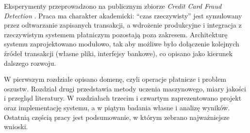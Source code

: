 Eksperymenty przeprowadzono na publicznym zbiorze \emph{Credit Card Fraud Detection} \cite{kaggle_ulb}. Praca ma charakter akademicki: \enquote{czas rzeczywisty} jest symulowany przez odtwarzanie zapisanych transakcji, a wdrożenie produkcyjne i integracja z rzeczywistym systemem płatniczym pozostają poza zakresem. Architekturę systemu zaprojektowano modułowo, tak aby możliwe było dołączenie kolejnych źródeł transakcji (własne pliki, interfejsy bankowe), co opisano jako kierunek dalszego rozwoju. 

W pierwszym rozdziale opisano domenę, czyli operacje płatnicze i problem oszustw. Rozdział drugi przedstawia metody uczenia maszynowego, miary jakości i przegląd literatury. W rozdziałach trzecim i czwartym zaprezentowano projekt oraz implementację systemu, a w piątym badania własne i analizę wyników. Ostatnią częścią pracy jest podsumowanie, w którym zebrano najważniejsze wnioski.
